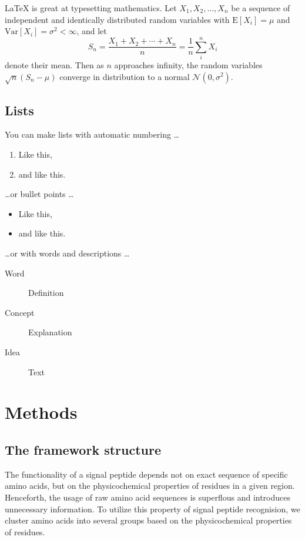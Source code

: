 \documentclass[fleqn,10pt,twoside]{gcb15submission}
\begin{document}
\LaTeX{} is great at typesetting mathematics. Let $X_1, X_2, \ldots, X_n$ be a sequence of independent and identically distributed random variables with $\text{E}[X_i] = \mu$ and $\text{Var}[X_i] = \sigma^2 < \infty$, and let
$$S_n = \frac{X_1 + X_2 + \cdots + X_n}{n}
      = \frac{1}{n}\sum_{i}^{n} X_i$$
denote their mean. Then as $n$ approaches infinity, the random variables $\sqrt{n}(S_n - \mu)$ converge in distribution to a normal $\mathcal{N}(0, \sigma^2)$.

\subsection*{Lists}

You can make lists with automatic numbering \dots

\begin{enumerate}[noitemsep] 
\item Like this,
\item and like this.
\end{enumerate}
\dots or bullet points \dots
\begin{itemize}[noitemsep] 
\item Like this,
\item and like this.
\end{itemize}
\dots or with words and descriptions \dots
\begin{description}
\item[Word] Definition
\item[Concept] Explanation
\item[Idea] Text
\end{description}



\section*{Methods}

\subsection*{The framework structure}

The functionality of a signal peptide depends not on exact sequence of specific amino acids, but on the physicochemical properties of residues in a given region. Henceforth, the usage of raw amino acid sequences is superflous and introduces unnecessary information. To utilize this property of signal peptide recognision, we cluster amino acids into several groups based on the physicochemical properties of residues.
\end{document}
